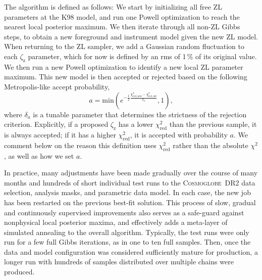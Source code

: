 \documentclass[twocolumn]{aa}
\newcommand{\cosmoglobe}{\textsc{Cosmoglobe}}
\begin{document}
The algorithm is defined as follows: We start by initializing all free
ZL parameters at the K98 model, and run one Powell optimization to
reach the nearest local posterior maximum. We then iterate through all
non-ZL Gibbs steps, to obtain a new foreground and instrument model
given the new ZL model. When returning to the ZL sampler, we add a
Gaussian random fluctuation to each $\zeta_{\mathrm{z}}$ parameter,
which for now is defined by an rms of 1\,\% of its original value. We
then run a new Powell optimization to identify a new local ZL
parameter maximum. This new model is then accepted or rejected based
on the following Metropolis-like accept probability,
\begin{equation}
a = \mathrm{min}\left(e^{-\frac{1}{2}\frac{\chi^2_{\mathrm{red,new}}-\chi^2_\mathrm{red,old}}{\delta_{a}}},1\right),
\label{eq:accept}
\end{equation}
where $\delta_a$ is a tunable parameter that determines the strictness
of the rejection criterion. Explicitly, if a proposed
$\zeta_{\mathrm{z}}$ has a lower $\chi_{\mathrm{red}}^2$ than the
previous sample, it is always accepted; if it has a higher
$\chi_{\mathrm{red}}^2$, it is accepted with probability $a$. We
comment below on the reason this definition uses $\chi^2_{\mathrm{red}}$
rather than the absolute $\chi^2$, as well as how we set $a$.

In practice, many adjustments have been made gradually over the course
of many months and hundreds of short individual test runs to the
\cosmoglobe\ DR2 data selection, analysis masks, and parametric data
model. In each case, the new job has been restarted on the previous
best-fit solution. This process of slow, gradual and continuously
supervised improvements also serves as a safe-guard against nonphysical
local posterior maxima, and effectively adds a meta-layer of simulated
annealing to the overall algorithm. Typically, the test runs were only
run for a few full Gibbs iterations, as in one to ten full
samples. Then, once the data and model configuration was considered
sufficiently mature for production, a longer run with hundreds of
samples distributed over multiple chains were produced.
\end{document}
